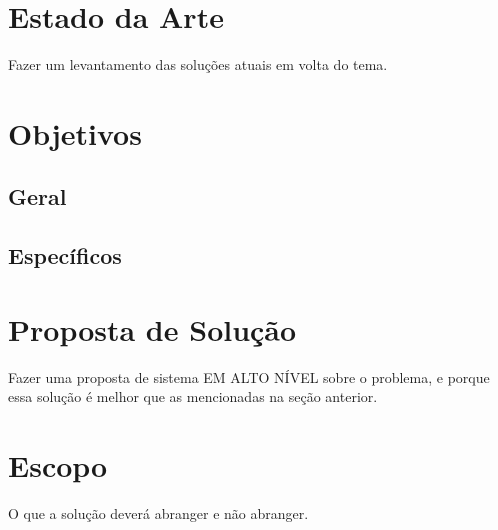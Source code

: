 \section{Estado da Arte}

Fazer um levantamento das soluções atuais em volta do tema.

\section{Objetivos}

\subsection{Geral}

\subsection{Específicos}

\section{Proposta de Solução}

Fazer uma proposta de sistema EM ALTO NÍVEL sobre o problema, e porque essa solução é melhor que as mencionadas na seção anterior.

\section{Escopo}

O que a solução deverá abranger e não abranger.
